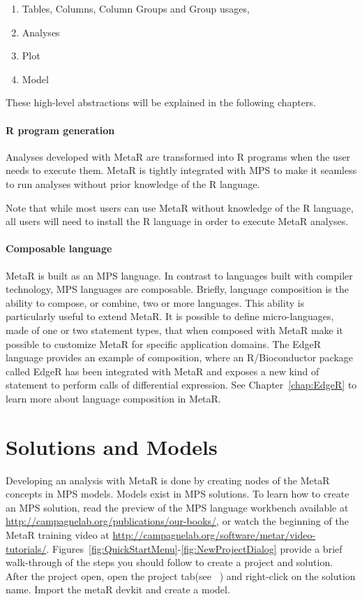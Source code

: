 \begin{enumerate}
	\item Tables, Columns, Column Groups and Group usages,
	\item Analyses
	\item Plot
	\item Model
\end{enumerate}

\noindent{}These high-level abstractions will be explained in the following chapters.

\paragraph{R program generation}
Analyses developed with MetaR are transformed into R programs when the user needs to execute them. MetaR is tightly integrated with MPS to make it seamless to run analyses without prior knowledge of the R language.
\begin{remark}
Note that while most users can use MetaR without knowledge of the R language, all users will need to install the R language in order to execute MetaR analyses.
\end{remark}

\paragraph{Composable language}
MetaR is built as an MPS language. In contrast to languages built with compiler technology, MPS languages are composable. Briefly, language composition is the ability to compose, or combine, two or more languages. This ability is particularly useful to extend MetaR. It is possible to define micro-languages, made of one or two statement types, that when composed with MetaR make it possible to customize MetaR for specific application domains. The EdgeR language provides an example of composition, where an R/Bioconductor package called EdgeR has been integrated with MetaR and exposes a new kind of statement to perform calls of differential expression. See Chapter~\ref{chap:EdgeR} to learn more about language composition in MetaR.
  
\section{Solutions and Models}
Developing an analysis with MetaR is done by creating nodes of the MetaR concepts in MPS models. Models exist in MPS solutions. To learn how to create an MPS solution, read the preview of the MPS language workbench available at \url{http://campagnelab.org/publications/our-books/}\cite{campagne2014mps}, or watch the beginning of the MetaR training video at \url{http://campagnelab.org/software/metar/video-tutorials/}. Figures~\ref{fig:QuickStartMenu}-\ref{fig:NewProjectDialog} provide a brief walk-through of the steps you should follow to create a project and solution. After the project open, open the project tab(see ~\cite{campagne2014mps}) and right-click on the solution name. Import the metaR devkit and create a model. 

